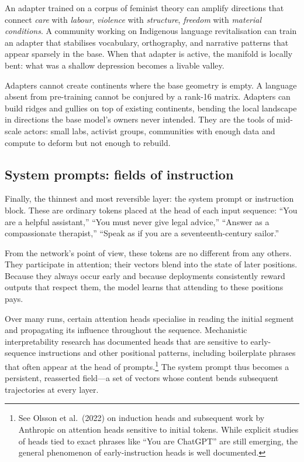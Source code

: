 \documentclass[12pt,a4paper]{article}
\begin{document}
An adapter trained on a corpus of feminist theory can amplify directions that connect \emph{care} with \emph{labour}, \emph{violence} with \emph{structure}, \emph{freedom} with \emph{material conditions}. A community working on Indigenous language revitalisation can train an adapter that stabilises vocabulary, orthography, and narrative patterns that appear sparsely in the base. When that adapter is active, the manifold is locally bent: what was a shallow depression becomes a livable valley.

Adapters cannot create continents where the base geometry is empty. A language absent from pre-training cannot be conjured by a rank-16 matrix. Adapters can build ridges and gullies on top of existing continents, bending the local landscape in directions the base model's owners never intended. They are the tools of mid-scale actors: small labs, activist groups, communities with enough data and compute to deform but not enough to rebuild.

\subsection*{System prompts: fields of instruction}

Finally, the thinnest and most reversible layer: the system prompt or instruction block. These are ordinary tokens placed at the head of each input sequence: ``You are a helpful assistant,'' ``You must never give legal advice,'' ``Answer as a compassionate therapist,'' ``Speak as if you are a seventeenth-century sailor.''

From the network's point of view, these tokens are no different from any others. They participate in attention; their vectors blend into the state of later positions. Because they always occur early and because deployments consistently reward outputs that respect them, the model learns that attending to these positions pays.

Over many runs, certain attention heads specialise in reading the initial segment and propagating its influence throughout the sequence. Mechanistic interpretability research has documented heads that are sensitive to early-sequence instructions and other positional patterns, including boilerplate phrases that often appear at the head of prompts.\footnote{See Olsson et al.\ (2022) on induction heads and subsequent work by Anthropic on attention heads sensitive to initial tokens. While explicit studies of heads tied to exact phrases like ``You are ChatGPT'' are still emerging, the general phenomenon of early-instruction heads is well documented.} The system prompt thus becomes a persistent, reasserted field---a set of vectors whose content bends subsequent trajectories at every layer.
\end{document}
